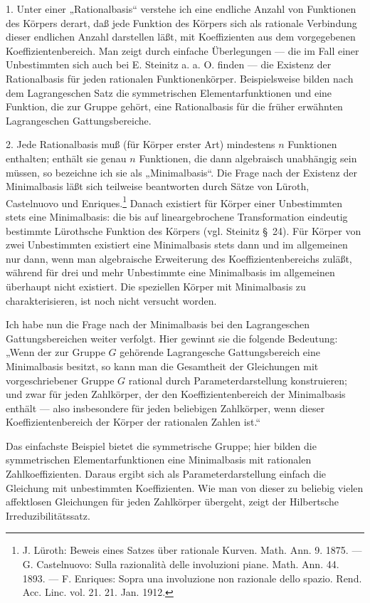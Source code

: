 \documentclass[11pt]{article}
\begin{document}
1. Unter einer „Rationalbasis“ verstehe ich eine endliche Anzahl von Funktionen des Körpers derart, daß jede Funktion des Körpers sich als rationale Verbindung dieser endlichen Anzahl darstellen läßt, mit Koeffizienten aus dem vorgegebenen Koeffizientenbereich. Man zeigt durch einfache Überlegungen --- die im Fall einer Unbestimmten sich auch bei E. Steinitz a. a. O. finden --- die Existenz der Rationalbasis für jeden rationalen Funktionenkörper. Beispielsweise bilden nach dem Lagrangeschen Satz die symmetrischen Elementarfunktionen und eine Funktion, die zur Gruppe gehört, eine Rationalbasis für die früher erwähnten Lagrangeschen Gattungsbereiche.

2. Jede Rationalbasis muß (für Körper erster Art) mindestens $n$ Funktionen enthalten; enthält sie genau $n$ Funktionen, die dann algebraisch unabhängig sein müssen, so bezeichne ich sie als „Minimalbasis“. Die Frage nach der Existenz der Minimalbasis läßt sich teilweise beantworten durch Sätze von Lüroth, Castelnuovo und Enriques.\footnote{J. Lüroth: Beweis eines Satzes über rationale Kurven. Math. Ann. 9. 1875. --- G. Castelnuovo: Sulla razionalità delle involuzioni piane. Math. Ann. 44. 1893. --- F. Enriques: Sopra una involuzione non razionale dello spazio. Rend. Acc. Linc. vol. 21. 21. Jan. 1912.} Danach existiert für Körper einer Unbestimmten stets eine Minimalbasis: die bis auf lineargebrochene Transformation eindeutig bestimmte Lürothsche Funktion des Körpers (vgl. Steinitz \S\ 24). Für Körper von zwei Unbestimmten existiert eine Minimalbasis stets dann und im allgemeinen nur dann, wenn man algebraische Erweiterung des Koeffizientenbereichs zuläßt, während für drei und mehr Unbestimmte eine Minimalbasis im allgemeinen überhaupt nicht existiert. Die speziellen Körper mit Minimalbasis zu charakterisieren, ist noch nicht versucht worden.

Ich habe nun die Frage nach der Minimalbasis bei den Lagrangeschen Gattungsbereichen weiter verfolgt. Hier gewinnt sie die folgende Bedeutung: „Wenn der zur Gruppe $G$ gehörende Lagrangesche Gattungsbereich eine Minimalbasis besitzt, so kann man die Gesamtheit der Gleichungen mit vorgeschriebener Gruppe $G$ rational durch Parameterdarstellung konstruieren; und zwar für jeden Zahlkörper, der den Koeffizientenbereich der Minimalbasis enthält --- also insbesondere für jeden beliebigen Zahlkörper, wenn dieser Koeffizientenbereich der Körper der rationalen Zahlen ist.“

Das einfachste Beispiel bietet die symmetrische Gruppe; hier bilden die symmetrischen Elementarfunktionen eine Minimalbasis mit rationalen Zahlkoeffizienten. Daraus ergibt sich als Parameterdarstellung einfach die Gleichung mit unbestimmten Koeffizienten. Wie man von dieser zu beliebig vielen affektlosen Gleichungen für jeden Zahlkörper übergeht, zeigt der Hilbertsche Irreduzibilitätssatz.
\end{document}
